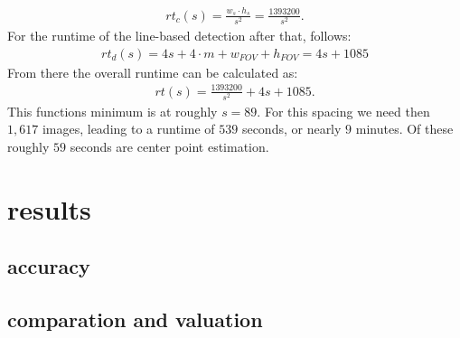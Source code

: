 \documentclass[journal,final,a4paper,twoside]{PS}
\begin{document}
\begin{align}
rt_c (s) = \frac{w_s\cdot h_s}{ s^2} =\frac{1393200}{s^2} .
\end{align}
For the runtime of the line-based detection after that, follows:
\begin{align}
rt_d (s) = 4s + 4\cdot m + w_{FOV} + h_{FOV} = 4s + 1085
\end{align}
From there the overall runtime can be calculated as:
\begin{align}
rt(s) = \frac{1393200}{s^2} + 4s +1085.
\end{align}
This functions minimum is at roughly $s = 89$. For this spacing we need then $1,617$ images, leading to a runtime of $539$ seconds, or nearly $9$ minutes. Of these roughly $59$ seconds are center point estimation.



\section{results}
\label{sec:results}
\subsection{accuracy}
\subsection{comparation and valuation}
\end{document}
